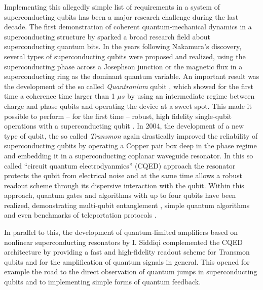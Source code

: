 Implementing this allegedly simple list of requirements in a system of superconducting qubits has been a major research challenge during the last decade. The first demonstration of coherent quantum-mechanical dynamics in a superconducting structure by \cite{nakamura_coherent_1999} sparked a broad research field about superconducting quantum bits. In the years following Nakamura's discovery, several types of superconducting qubits were proposed and realized, using the superconducting phase \citep{martinis_energy-level_1985,martinis_rabi_2002} across a Josephson junction or the magnetic flux \citep{mooij_josephson_1999,chiorescu_coherent_2003} in a superconducting ring as the dominant quantum variable. An important result was the development of the so called {\it Quantronium} qubit \citep{vion_manipulating_2002}, which showed for the first time a coherence time larger than 1 $\mu s$ by using an intermediate regime between charge and phase qubits and operating the device at a sweet spot. This made it possible to perform -- for the first time -- robust, high fidelity single-qubit operations with a superconducting qubit \citep{collin_nmr-like_2004}. In 2004, the development of a new type of qubit, the so called {\it Transmon} \citep{wallraff_strong_2004} again drastically improved the reliability of superconducting qubits by operating a Copper pair box deep in the phase regime and embedding it in a superconducting coplanar waveguide resonator. In this so called ``circuit quantum electrodyanmics'' (CQED) approach \citep{blais_cavity_2004} the resonator protects the qubit from electrical noise and at the same time allows a robust readout scheme through its dispersive interaction with the qubit. Within this approach, quantum gates and algorithms with up to four qubits have been realized, demonstrating multi-qubit entanglement \citep{dicarlo_preparation_2010}, simple quantum algorithms \citep{dicarlo_demonstration_2009} and even benchmarks of teleportation protocols \citep{baur_benchmarking_2011}.

In parallel to this, the development of quantum-limited amplifiers based on nonlinear superconducting resonators by I. Siddiqi \citep{siddiqi_rf-driven_2004} complemented the CQED architecture by providing a fast and high-fidelity readout scheme for Transmon qubits \citep{siddiqi_dispersive_2006,mallet_single-shot_2009} and for the amplification of quantum signals in general. This opened for example the road to the direct observation of quantum jumps in superconducting qubits \citep{vijay_observation_2011} and to implementing simple forms of quantum feedback.

